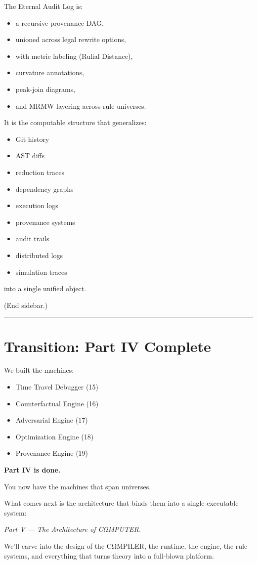 The Eternal Audit Log is:

\begin{itemize}
\tightlist
\item
  a recursive provenance DAG,
\item
  unioned across legal rewrite options,
\item
  with metric labeling (Rulial Distance),
\item
  curvature annotations,
\item
  peak-join diagrams,
\item
  and MRMW layering across rule universes.
\end{itemize}

It is the computable structure that generalizes:

\begin{itemize}
\tightlist
\item
  Git history
\item
  AST diffs
\item
  reduction traces
\item
  dependency graphs
\item
  execution logs
\item
  provenance systems
\item
  audit trails
\item
  distributed logs
\item
  simulation traces
\end{itemize}

into a single unified object.

(End sidebar.)

\begin{center}\rule{0.5\linewidth}{0.5pt}\end{center}

\section{Transition: Part IV
Complete}\label{transition-part-iv-complete}

We built the machines:

\begin{itemize}
\tightlist
\item
  Time Travel Debugger (15)
\item
  Counterfactual Engine (16)
\item
  Adversarial Engine (17)
\item
  Optimization Engine (18)
\item
  Provenance Engine (19)
\end{itemize}

\textbf{Part IV is done.}

You now have the machines that span universes.

What comes next is the architecture that binds them into a single
executable system:

\emph{Part V --- The Architecture of CΩMPUTER.}

We'll carve into the design of the CΩMPILER, the runtime, the engine,
the rule systems, and everything that turns theory into a full-blown
platform.
